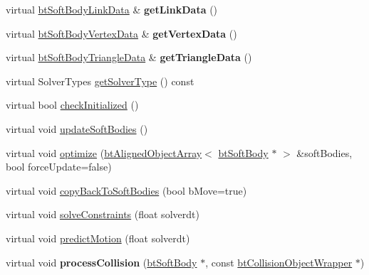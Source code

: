 \begin{DoxyCompactItemize}
\item 
\mbox{\label{classbtOpenCLSoftBodySolver_aaa750c0d87773ecc2d7f0c6f4ac725ed}} 
virtual \hyperlink{classbtSoftBodyLinkData}{bt\+Soft\+Body\+Link\+Data} \& {\bfseries get\+Link\+Data} ()
\item 
\mbox{\label{classbtOpenCLSoftBodySolver_ab99c30dc89a000f76c989b5445a741ee}} 
virtual \hyperlink{classbtSoftBodyVertexData}{bt\+Soft\+Body\+Vertex\+Data} \& {\bfseries get\+Vertex\+Data} ()
\item 
\mbox{\label{classbtOpenCLSoftBodySolver_a3920ebb51563ce5e77f2e097c9e7f8de}} 
virtual \hyperlink{classbtSoftBodyTriangleData}{bt\+Soft\+Body\+Triangle\+Data} \& {\bfseries get\+Triangle\+Data} ()
\item 
virtual Solver\+Types \hyperlink{classbtOpenCLSoftBodySolver_a2b643547caacc5c1daedff3f67a140fb}{get\+Solver\+Type} () const
\item 
virtual bool \hyperlink{classbtOpenCLSoftBodySolver_a246093f49e31b6c17fad98c7ac878860}{check\+Initialized} ()
\item 
virtual void \hyperlink{classbtOpenCLSoftBodySolver_a557948307d1eb34fa1af3d091ca243ab}{update\+Soft\+Bodies} ()
\item 
virtual void \hyperlink{classbtOpenCLSoftBodySolver_abfa7d114dc00cb643d73ecb79682cebe}{optimize} (\hyperlink{classbtAlignedObjectArray}{bt\+Aligned\+Object\+Array}$<$ \hyperlink{classbtSoftBody}{bt\+Soft\+Body} $\ast$ $>$ \&soft\+Bodies, bool force\+Update=false)
\item 
virtual void \hyperlink{classbtOpenCLSoftBodySolver_a374b440216ba03aa39db58e23280c08c}{copy\+Back\+To\+Soft\+Bodies} (bool b\+Move=true)
\item 
virtual void \hyperlink{classbtOpenCLSoftBodySolver_af418daf793b0cfe4d0af908e5cd43360}{solve\+Constraints} (float solverdt)
\item 
virtual void \hyperlink{classbtOpenCLSoftBodySolver_a489602e08b20f977be04543e616abf46}{predict\+Motion} (float solverdt)
\item 
\mbox{\label{classbtOpenCLSoftBodySolver_ac3ad7ba6d7b8958a98ee1bca4a90ae9f}} 
virtual void {\bfseries process\+Collision} (\hyperlink{classbtSoftBody}{bt\+Soft\+Body} $\ast$, const \hyperlink{structbtCollisionObjectWrapper}{bt\+Collision\+Object\+Wrapper} $\ast$)

\end{DoxyCompactItemize}
